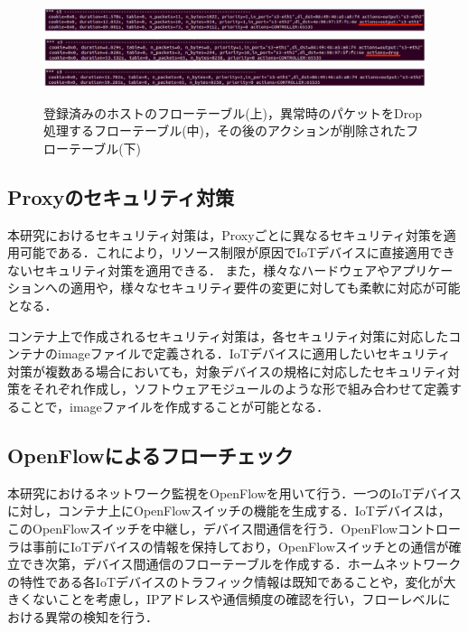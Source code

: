 \documentclass[a4paper,10pt,twocolumn,uplatex]{jsarticle}
\begin{document}
\begin{figure}[!tb]
  \centering
  \includegraphics[width=\linewidth]{img/result_flow4v3.eps}
  \includegraphics[width=\linewidth]{img/result_flow2v3.eps}
  \includegraphics[width=\linewidth]{img/result_flow3v2.eps}
  \caption{登録済みのホストのフローテーブル(上)，異常時のパケットをDrop処理するフローテーブル(中)，その後のアクションが削除されたフローテーブル(下)}
  \label{fig:result1}
\end{figure}

\subsection{Proxyのセキュリティ対策}
本研究におけるセキュリティ対策は，Proxyごとに異なるセキュリティ対策を適用可能である．これにより，リソース制限が原因でIoTデバイスに直接適用できないセキュリティ対策を適用できる．
また，様々なハードウェアやアプリケーションへの適用や，様々なセキュリティ要件の変更に対しても柔軟に対応が可能となる．\par
コンテナ上で作成されるセキュリティ対策は，各セキュリティ対策に対応したコンテナのimageファイルで定義される．IoTデバイスに適用したいセキュリティ対策が複数ある場合においても，対象デバイスの規格に対応したセキュリティ対策をそれぞれ作成し，ソフトウェアモジュールのような形で組み合わせて定義することで，imageファイルを作成することが可能となる．

\subsection{OpenFlowによるフローチェック}
本研究におけるネットワーク監視をOpenFlowを用いて行う．一つのIoTデバイスに対し，コンテナ上にOpenFlowスイッチの機能を生成する．IoTデバイスは，このOpenFlowスイッチを中継し，デバイス間通信を行う．OpenFlowコントローラは事前にIoTデバイスの情報を保持しており，OpenFlowスイッチとの通信が確立でき次第，デバイス間通信のフローテーブルを作成する．ホームネットワークの特性である各IoTデバイスのトラフィック情報は既知であることや，変化が大きくないことを考慮し，IPアドレスや通信頻度の確認を行い，フローレベルにおける異常の検知を行う．
\end{document}

